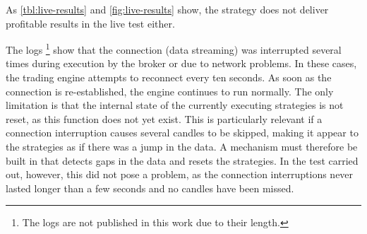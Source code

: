 \noindent
As \autoref{tbl:live-results} and \autoref{fig:live-results} show, the strategy does not deliver profitable results in the live test either.

The logs \footnote{The logs are not published in this work due to their length.} show that the connection (data streaming) was interrupted several times during execution by the broker or due to network problems.
In these cases, the trading engine attempts to reconnect every ten seconds.
As soon as the connection is re-established, the engine continues to run normally.
The only limitation is that the internal state of the currently executing strategies is not reset, as this function does not yet exist.
This is particularly relevant if a connection interruption causes several candles to be skipped, making it appear to the strategies as if there was a jump in the data.
A mechanism must therefore be built in that detects gaps in the data and resets the strategies.
In the test carried out, however, this did not pose a problem, as the connection interruptions never lasted longer than a few seconds and no candles have been missed.
